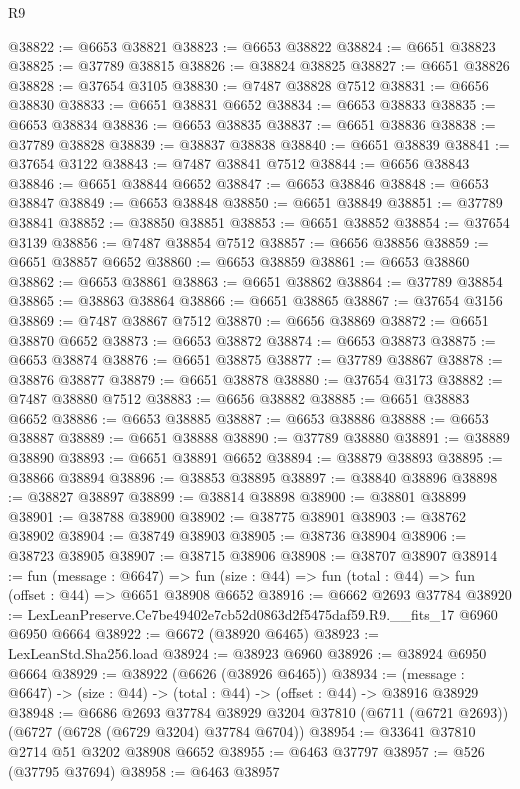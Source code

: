 \begin{lexlean}{R9}
\begin{coremodule}
@38822 := @6653 @38821
@38823 := @6653 @38822
@38824 := @6651 @38823
@38825 := @37789 @38815
@38826 := @38824 @38825
@38827 := @6651 @38826
@38828 := @37654 @3105
@38830 := @7487 @38828 @7512
@38831 := @6656 @38830
@38833 := @6651 @38831 @6652
@38834 := @6653 @38833
@38835 := @6653 @38834
@38836 := @6653 @38835
@38837 := @6651 @38836
@38838 := @37789 @38828
@38839 := @38837 @38838
@38840 := @6651 @38839
@38841 := @37654 @3122
@38843 := @7487 @38841 @7512
@38844 := @6656 @38843
@38846 := @6651 @38844 @6652
@38847 := @6653 @38846
@38848 := @6653 @38847
@38849 := @6653 @38848
@38850 := @6651 @38849
@38851 := @37789 @38841
@38852 := @38850 @38851
@38853 := @6651 @38852
@38854 := @37654 @3139
@38856 := @7487 @38854 @7512
@38857 := @6656 @38856
@38859 := @6651 @38857 @6652
@38860 := @6653 @38859
@38861 := @6653 @38860
@38862 := @6653 @38861
@38863 := @6651 @38862
@38864 := @37789 @38854
@38865 := @38863 @38864
@38866 := @6651 @38865
@38867 := @37654 @3156
@38869 := @7487 @38867 @7512
@38870 := @6656 @38869
@38872 := @6651 @38870 @6652
@38873 := @6653 @38872
@38874 := @6653 @38873
@38875 := @6653 @38874
@38876 := @6651 @38875
@38877 := @37789 @38867
@38878 := @38876 @38877
@38879 := @6651 @38878
@38880 := @37654 @3173
@38882 := @7487 @38880 @7512
@38883 := @6656 @38882
@38885 := @6651 @38883 @6652
@38886 := @6653 @38885
@38887 := @6653 @38886
@38888 := @6653 @38887
@38889 := @6651 @38888
@38890 := @37789 @38880
@38891 := @38889 @38890
@38893 := @6651 @38891 @6652
@38894 := @38879 @38893
@38895 := @38866 @38894
@38896 := @38853 @38895
@38897 := @38840 @38896
@38898 := @38827 @38897
@38899 := @38814 @38898
@38900 := @38801 @38899
@38901 := @38788 @38900
@38902 := @38775 @38901
@38903 := @38762 @38902
@38904 := @38749 @38903
@38905 := @38736 @38904
@38906 := @38723 @38905
@38907 := @38715 @38906
@38908 := @38707 @38907
@38914 := fun (message : @6647) =>
  fun (size : @44) => fun (total : @44) => fun (offset : @44) => @6651 @38908 @6652
@38916 := @6662 @2693 @37784
@38920 := LexLeanPreserve.Ce7be49402e7cb52d0863d2f5475daf59.R9.__fits_17 @6960 @6950 @6664
@38922 := @6672 (@38920 @6465)
@38923 := LexLeanStd.Sha256.load
@38924 := @38923 @6960
@38926 := @38924 @6950 @6664
@38929 := @38922 (@6626 (@38926 @6465))
@38934 := (message : @6647) -> (size : @44) -> (total : @44) -> (offset : @44) -> @38916 @38929
@38948 := @6686
    @2693
    @37784
    @38929
    @3204
    @37810
    (@6711 (@6721 @2693))
    (@6727 (@6728 (@6729 @3204) @37784 @6704))
@38954 := @33641 @37810 @2714 @51 @3202 @38908 @6652
@38955 := @6463 @37797
@38957 := @526 (@37795 @37694)
@38958 := @6463 @38957

\end{coremodule}
\end{lexlean}
